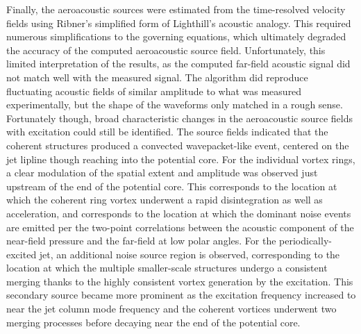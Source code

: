 Finally, the aeroacoustic sources were estimated from the time-resolved velocity fields using Ribner's simplified form of Lighthill's acoustic analogy.
This required numerous simplifications to the governing equations, which ultimately degraded the accuracy of the computed aeroacoustic source field.
Unfortunately, this limited interpretation of the results, as the computed far-field acoustic signal did not match well with the measured signal.
The algorithm did reproduce fluctuating acoustic fields of similar amplitude to what was measured experimentally, but the shape of the waveforms only matched in a rough sense.
Fortunately though, broad characteristic changes in the aeroacoustic source fields with excitation could still be identified.
The source fields indicated that the coherent structures produced a convected wavepacket-like event, centered on the jet lipline though reaching into the potential core.
For the individual vortex rings, a clear modulation of the spatial extent and amplitude was observed just upstream of the end of the potential core.
This corresponds to the location at which the coherent ring vortex underwent a rapid disintegration as well as acceleration, and corresponds to the location at which the dominant noise events are emitted per the two-point correlations between the acoustic component of the near-field pressure and the far-field at low polar angles.
For the periodically-excited jet, an additional noise source region is observed, corresponding to the location at which the multiple smaller-scale structures undergo a consistent merging thanks to the highly consistent vortex generation by the excitation.
This secondary source became more prominent as the excitation frequency increased to near the jet column mode frequency and the coherent vortices underwent two merging processes before decaying near the end of the potential core.

